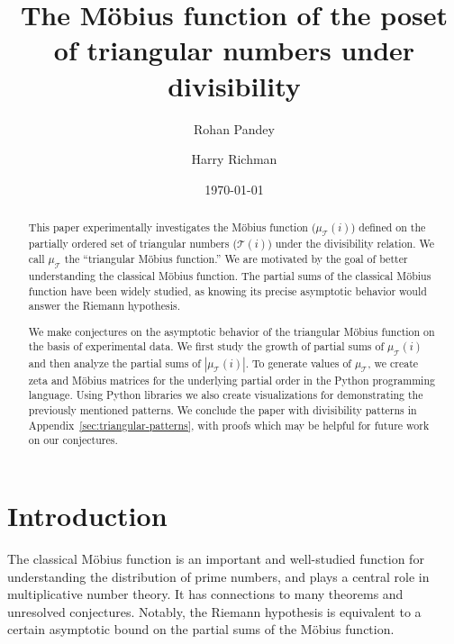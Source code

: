 \documentclass{amsart}
\title[M\"{o}bius function of triangular numbers]{The M\"obius function of the poset of triangular numbers under divisibility}
\author{Rohan Pandey}
\author{Harry Richman}
\date{\today}
\theoremstyle{definition}
\newcommand{\NN}{\mathbb{N}}
\newcommand{\Mobius}{M\"obius}
\newcommand{\leqtri}{\leq_{\tri}}
\newcommand{\mutri}{\mu_{\tri}}
\newcommand{\tri}{\mathcal T}
\begin{document}
\begin{abstract}
    This paper experimentally investigates the \Mobius{} function ($\mutri(i)$) defined on the partially ordered set of triangular numbers ($\tri(i)$) under the divisibility relation. 
    We call $\mutri$ the ``triangular \Mobius{} function.''
    We are motivated by the goal of better understanding the classical \Mobius{} function.
    The partial sums of the classical \Mobius{} function have been widely studied, as knowing its precise asymptotic behavior would answer the Riemann hypothesis. 

    We make conjectures on the asymptotic behavior of the triangular \Mobius{} function on the basis of experimental data.
    We first study the growth of partial sums of $\mutri(i)$ 
    and then analyze the partial sums of $|\mutri(i)|$.
    To generate values  of $\mutri$, we create zeta and \Mobius{} matrices for the underlying partial order  in the Python programming language.
    Using Python libraries we also create visualizations for demonstrating the previously mentioned patterns. 
    We conclude the paper with divisibility patterns in Appendix~\ref{sec:triangular-patterns}, with proofs which may be helpful for future work on our conjectures. 
    
\end{abstract}

\maketitle

\tableofcontents

\section{Introduction}

The classical \Mobius{} function is an important and well-studied function for understanding the distribution of prime numbers, and plays a central role in multiplicative number theory.
It has connections to many theorems and unresolved conjectures.
Notably, the Riemann hypothesis is equivalent to a certain asymptotic bound on the partial sums of the \Mobius{} function.
\end{document}
